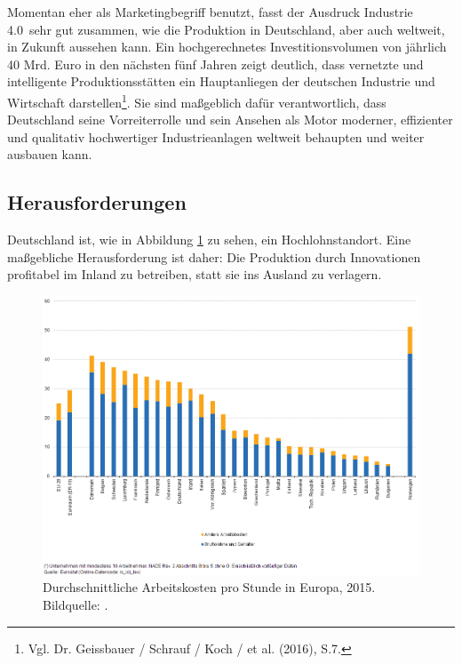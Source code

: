 Momentan eher als Marketingbegriff benutzt, fasst der Ausdruck \frqq Industrie 4.0\flqq\ sehr gut zusammen, wie die Produktion in Deutschland, aber auch weltweit, in Zukunft aussehen kann. Ein hochgerechnetes Investitionsvolumen von jährlich 40 Mrd. Euro in den nächsten fünf Jahren zeigt deutlich, dass vernetzte und intelligente Produktionsstätten ein Hauptanliegen der deutschen Industrie und Wirtschaft darstellen\footnote{ Vgl. Dr. Geissbauer / Schrauf / Koch / et al. (2016), S.7.}. Sie sind maßgeblich dafür verantwortlich, dass Deutschland seine Vorreiterrolle und sein Ansehen als Motor moderner, effizienter und qualitativ hochwertiger Industrieanlagen weltweit behaupten und weiter ausbauen kann.

\subsection{Herausforderungen}\label{ssec:i40Challenges}
Deutschland ist, wie in Abbildung \ref{fig:EULabourPerHour} zu sehen, ein Hochlohnstandort. Eine maßgebliche Herausforderung ist daher: Die Produktion durch Innovationen profitabel im Inland zu betreiben, statt sie ins Ausland zu verlagern.

\begin{figure}[ht]
	\centering
	\includegraphics[width=1.\textwidth]{figuren/Estimated_hourly_labour_costs_2015}
	\caption{Durchschnittliche Arbeitskosten pro Stunde in Europa, 2015. Bildquelle: \cite{hochlohnstandort}.}
	\label{fig:EULabourPerHour}
\end{figure}

